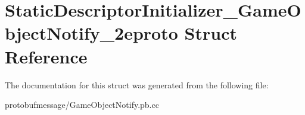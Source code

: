 \hypertarget{struct_static_descriptor_initializer___game_object_notify__2eproto}{\section{Static\-Descriptor\-Initializer\-\_\-\-Game\-Object\-Notify\-\_\-2eproto Struct Reference}
\label{struct_static_descriptor_initializer___game_object_notify__2eproto}
}


The documentation for this struct was generated from the following file\-:\begin{DoxyCompactItemize}
\item 
protobufmessage/Game\-Object\-Notify.\-pb.\-cc\end{DoxyCompactItemize}
